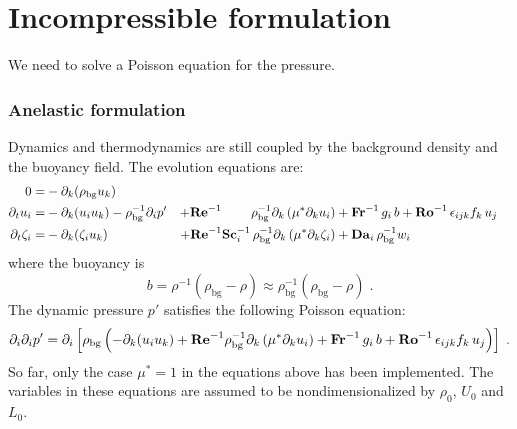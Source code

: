 \section{Incompressible formulation}

We need to solve a Poisson equation for the pressure.

\subsubsection{Anelastic formulation}

Dynamics and thermodynamics are still coupled by the background density and the buoyancy field. The evolution equations are:
\begin{subequations}
    \begin{align}
        0                 =& -\partial_k(\rho_\mathrm{bg}u_k)   & \\
        \partial_t  u_i   =& -\partial_k ( u_i u_k )-\rho_\mathrm{bg}^{-1}\partial_i p' &
        +\mathrm{\bf Re}^{-1}\qquad\;\rho_\mathrm{bg}^{-1}\partial_k \left( \mu^{*} \partial_k u_i\right) & +\mathrm{\bf Fr}^{-1}\, g_i\,b+\mathrm{\bf Ro}^{-1}\,\epsilon_{ijk} f_k\,u_j  \\
        \partial_t\zeta_i =& -\partial_k (\zeta_i u_k) &
        + \mathrm{\bf Re}^{-1}\mathrm{\bf Sc}_i^{-1}\, \rho_\mathrm{bg}^{-1}\partial_k \left( \mu^{*}\partial_k\zeta_i\right) &+ \mathrm{\bf Da}_i\,\rho_\mathrm{bg}^{-1}w_i
    \end{align}
\end{subequations}
where the buoyancy is
\begin{equation}
    b=\rho^{-1}(\rho_\mathrm{bg}-\rho)\approx\rho_\mathrm{bg}^{-1}(\rho_\mathrm{bg}-\rho) \;.
\end{equation}
The dynamic pressure $p'$ satisfies the following Poisson equation:
\begin{equation}
    \partial_i\partial_ip'=\partial_i\left[\rho_\mathrm{bg}\left(
    -\partial_k ( u_i u_k )+\mathrm{\bf Re}^{-1}\rho_\mathrm{bg}^{-1}\partial_k \left( \mu^{*} \partial_k u_i\right) +\mathrm{\bf Fr}^{-1}\, g_i\,b+\mathrm{\bf Ro}^{-1}\,\epsilon_{ijk} f_k\,u_j
    \right)\right]\;.
\end{equation}
So far, only the case $\mu^*=1$ in the equations above has been implemented. The variables in these equations are assumed to be nondimensionalized by $\rho_0$, $U_0$ and $L_0$.

